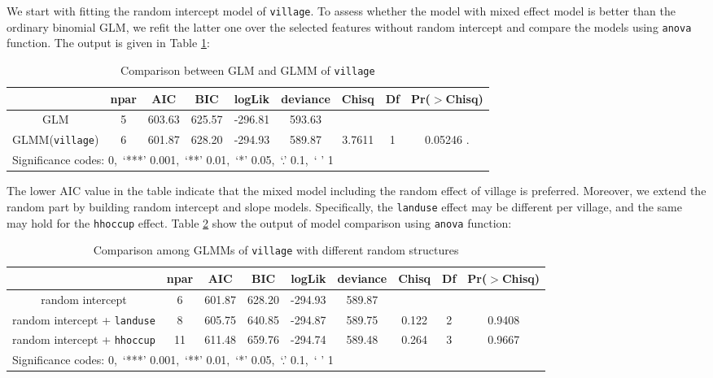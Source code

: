\documentclass[11pt,twoside]{article}
\numberwithin{Theorem}{section}
\numberwithin{Definition}{section}
\numberwithin{Lemma}{section}
\numberwithin{Algorithm}{section}
\numberwithin{equation}{section}
\begin{document}
We start with fitting the random intercept model of \texttt{village}. To assess whether the model with mixed effect model is better than the ordinary binomial GLM, we refit the latter one over the selected features without random intercept and compare the models using \texttt{anova} function. The output is given in Table \ref{tab:glmm1}:

\begin{table}[!h]
	\centering
	\begin{tabular}{|c|c|c|c|c|c|c|c|c|}
		\hline
		 & npar & AIC & BIC & logLik & deviance & Chisq & Df & Pr($>$Chisq) \\  
		 \hline
		GLM & 5 & 603.63 & 625.57 & -296.81 & 593.63 & & & \\                      
		GLMM(\texttt{village}) & 6 & 601.87 & 628.20 & -294.93 & 589.87 & 3.7611 & 1 & 0.05246 . \\
		\hline
		\multicolumn{9}{|l|}{Significance codes: 0,\ ‘***’ 0.001,\ ‘**’ 0.01,\ ‘*’ 0.05,\ ‘.’ 0.1,\ ‘ ’ 1} \\
		\hline
	\end{tabular}
	\caption{Comparison between GLM and GLMM of \texttt{village}}
	\label{tab:glmm1}
\end{table}

The lower AIC value in the table indicate that the mixed model including the random effect of village is preferred. Moreover, we extend the random part by building random intercept and slope models. Specifically, the \texttt{landuse} effect may be different per village, and the same may hold for the \texttt{hhoccup} effect. Table \ref{tab:glmm2} show the output of model comparison using \texttt{anova} function:

\begin{table}[!h]
	\centering
	\begin{tabular}{|c|c|c|c|c|c|c|c|c|}
		\hline
		& npar & AIC & BIC & logLik & deviance & Chisq & Df & Pr($>$Chisq) \\  
		\hline
		random intercept & 6 & 601.87 & 628.20 & -294.93 & 589.87 & & & \\                      
		random intercept + \texttt{landuse} & 8 & 605.75 & 640.85 & -294.87 & 589.75 & 0.122 & 2 & 0.9408 \\
		random intercept + \texttt{hhoccup} & 11 & 611.48 & 659.76 & -294.74 & 589.48 & 0.264 & 3 & 0.9667 \\
		\hline
		\multicolumn{9}{|l|}{Significance codes: 0,\ ‘***’ 0.001,\ ‘**’ 0.01,\ ‘*’ 0.05,\ ‘.’ 0.1,\ ‘ ’ 1} \\
		\hline
	\end{tabular}
	\caption{Comparison among GLMMs of \texttt{village} with different random structures}
	\label{tab:glmm2}
\end{table}
\end{document}
